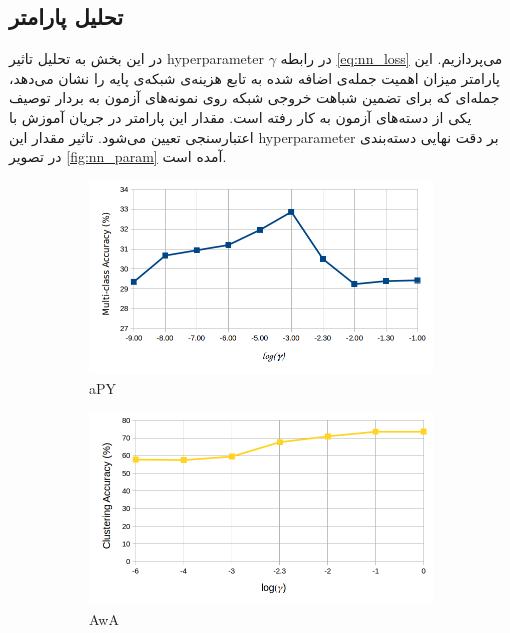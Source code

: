 \subsection{تحلیل پارامتر}\label{exp:nn_params}
در این بخش به تحلیل تاثیر \gls{hyperparameter} $\gamma$ در رابطه \eqref{eq:nn_loss} می‌پردازیم. این پارامتر میزان اهمیت جمله‌ی اضافه شده به تابع هزینه‌ی  شبکه‌ی پایه را نشان می‌دهد، جمله‌ای  که برای تضمین شباهت خروجی شبکه روی نمونه‌های آزمون به بردار توصیف یکی از دسته‌های آزمون به کار  رفته است. مقدار این پارامتر در جریان آموزش با اعتبارسنجی تعیین می‌شود. تاثیر مقدار این \gls{hyperparameter} بر دقت نهایی دسته‌بندی در تصویر
\ref{fig:nn_param}
آمده است.
\begin{figure}[!th]
\centering
\begin{subfigure}[b]{0.43\linewidth}
    \includegraphics[width=\linewidth]{images/nn_param_apy}
    \caption{aPY}
\end{subfigure}
%
\begin{subfigure}[b]{0.43\linewidth}
    \includegraphics[width=\linewidth]{images/nn_gamma_awa}
    \caption{AwA}
\end{subfigure}
%
\begin{subfigure}[b]{0.43\linewidth}

\end{subfigure}
\end{figure}
